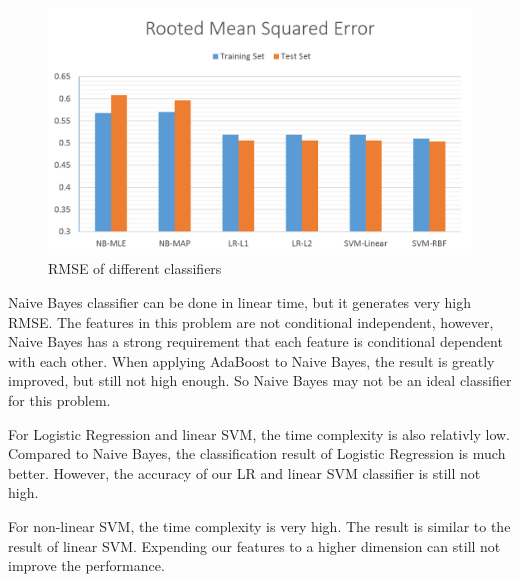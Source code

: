 \documentclass{article} %
\begin{document}
\begin{figure}[H]
\begin{center}
\includegraphics[scale=0.4]{RMSE.png}
\end{center}
\caption{RMSE of different classifiers}
\end{figure}


 
Naive Bayes classifier can be done in linear time, but it generates very high RMSE. The features in this problem are not conditional independent, however, Naive Bayes has a strong requirement that each feature is conditional dependent with each other. When applying AdaBoost to Naive Bayes, the result is greatly improved, but still not high enough. So Naive Bayes may not be an ideal classifier for this problem.

For Logistic Regression and linear SVM, the time complexity is also relativly low. Compared to Naive Bayes, the classification result of Logistic Regression is much better. However, the accuracy of our LR and linear SVM classifier is still not high. 

For non-linear SVM, the time complexity is very high. The result is similar to the result of linear SVM. Expending our features to a higher dimension can still not improve the performance.
\end{document}

